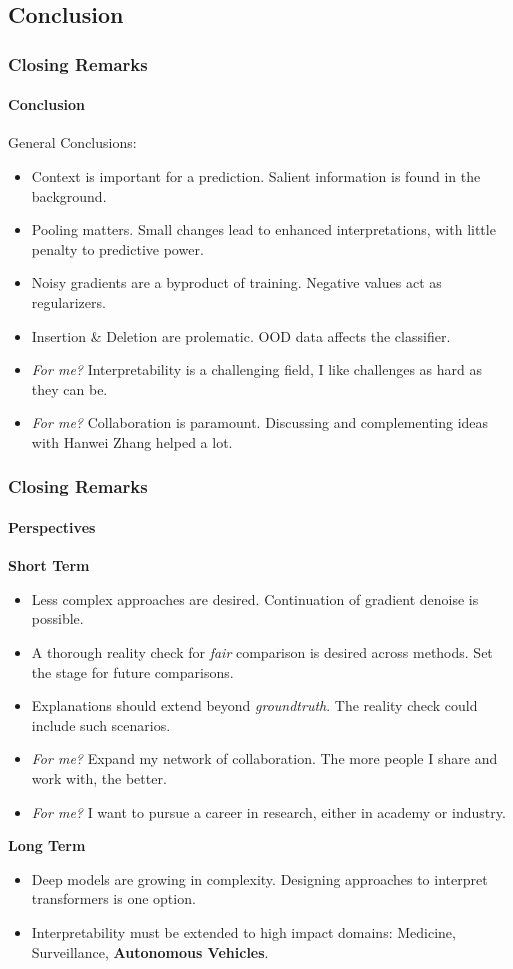 \subsection*{Conclusion}
\begin{frame}
    \frametitle{Closing Remarks}
    \framesubtitle{Conclusion}
    \small
    General Conclusions:\\
    \begin{itemize}
        \item Context is important for a prediction. Salient information is found in the background.
        \item Pooling matters. Small changes lead to enhanced interpretations, with little penalty to predictive power.
        \item Noisy gradients are a byproduct of training. Negative values act as regularizers.
        \item Insertion \& Deletion are prolematic. OOD data affects the classifier.
        \item \emph{For me?} \pause Interpretability is a challenging field, I like challenges as hard as they can be.
        \item \emph{For me?} \pause Collaboration is paramount. Discussing and complementing ideas with Hanwei Zhang helped a lot.
    \end{itemize}
\end{frame}

\begin{frame}
    \frametitle{Closing Remarks}
    \framesubtitle{Perspectives}
    \small 
    \textbf{Short Term}
        \begin{itemize}
            \item Less complex approaches are desired. Continuation of  gradient denoise is possible.
            \item A thorough reality check for \emph{fair} comparison is desired across methods. Set the stage for future comparisons.
            \item Explanations should extend beyond \emph{groundtruth}. The reality check could include such scenarios.
            \item \emph{For me?} \pause Expand my network of collaboration. The more people I share and work with, the better.
            \item \emph{For me?} \pause I want to pursue a career in research, either in academy or industry.
        \end{itemize}
    \textbf{Long Term}
    \begin{itemize}
        \item Deep models are growing in complexity. Designing approaches to interpret transformers is one option.
        \item Interpretability must be extended to high impact domains: Medicine, Surveillance, \textbf{Autonomous Vehicles}.
    \end{itemize}
\end{frame}